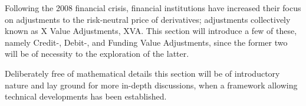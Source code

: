 \documentclass[main.tex]{subfiles}
\begin{document}
    Following the 2008 financial crisis,
    financial institutions have increased their focus on 
    adjustments to the risk-neutral price of derivatives;
    adjustments collectively known as X Value Adjustments, XVA.
    This section will introduce a few of these, 
    namely Credit-, Debit-, and Funding Value Adjustments,
    since the former two will be of necessity to the exploration of the latter.

    Deliberately free of mathematical details this section will be of introductory nature 
    and lay ground for more in-depth discussions, 
    when a framework allowing technical developments has been established.
\end{document}

